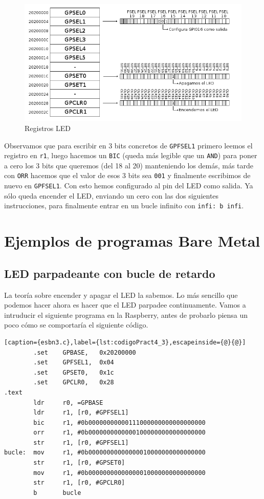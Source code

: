 \begin{figure}[h]
  \centering
    \includegraphics[width=14cm]{graphs/led.png}
  \caption{Registros LED}
  \label{fig:led}
\end{figure}

Observamos que para escribir en 3 bits concretos de {\tt GPFSEL1} primero leemos
el registro en {\tt r1}, luego hacemos un {\tt BIC} (queda más legible que un {\tt AND})
para poner a cero los 3 bits que queremos (del 18 al 20) manteniendo los demás,
más tarde con {\tt ORR} hacemos que el valor de esos 3 bits sea {\tt 001} y finalmente
escribimos de nuevo en {\tt GPFSEL1}. Con esto hemos configurado al pin del LED como salida.
Ya sólo queda encender el LED, enviando un cero con las dos siguientes instrucciones, para
finalmente entrar en un bucle infinito con {\tt infi: b infi}.

\section{Ejemplos de programas Bare Metal}

\subsection{LED parpadeante con bucle de retardo}

La teoría sobre encender y apagar el LED la sabemos. Lo más sencillo que podemos hacer ahora
es hacer que el LED parpadee continuamente. Vamos a intruducir el siguiente programa en la
Raspberry, antes de probarlo piensa un poco cómo se comportaría el siguiente código.

\begin{lstlisting}[caption={esbn3.c},label={lst:codigoPract4_3},escapeinside={@}{@}]
        .set    GPBASE,   0x20200000
        .set    GPFSEL1,  0x04
        .set    GPSET0,   0x1c
        .set    GPCLR0,   0x28
.text
        ldr     r0, =GPBASE
        ldr     r1, [r0, #GPFSEL1]
        bic     r1, #0b00000000000111000000000000000000
        orr     r1, #0b00000000000001000000000000000000
        str     r1, [r0, #GPFSEL1]
bucle:  mov     r1, #0b00000000000000010000000000000000
        str     r1, [r0, #GPSET0]
        mov     r1, #0b00000000000000010000000000000000
        str     r1, [r0, #GPCLR0]
        b       bucle
\end{lstlisting}


